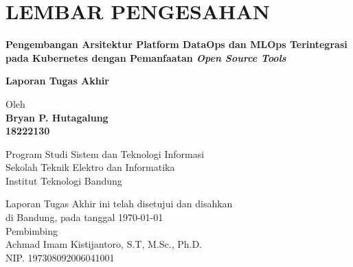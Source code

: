 \chapter*{LEMBAR PENGESAHAN}


\begin{center}
    \vspace{2cm}
  {\large\bfseries Pengembangan Arsitektur Platform DataOps dan MLOps Terintegrasi pada Kubernetes dengan Pemanfaatan \textit{Open Source Tools}}\\
     \vspace{2cm}

  {\Large \textbf{Laporan Tugas Akhir}}\\


  \vspace{1.5cm}


  {\large Oleh}\\[0.3cm]
    \textbf{
    {\large Bryan P. Hutagalung}\\
    {\large 18222130}
  }\\

  \vspace{0.5cm}

  {\large Program Studi Sistem dan Teknologi Informasi}\\
  {\large Sekolah Teknik Elektro dan Informatika}\\
  {\large Institut Teknologi Bandung}\\

  \vspace{1.5cm}

  Laporan Tugas Akhir ini telah disetujui dan disahkan\\
  di Bandung, pada tanggal \today\\[1cm]

	Pembimbing  \\[3cm]
	Achmad Imam Kistijantoro, S.T, M.Sc., Ph.D.   \\[0.2cm]
	NIP. 197308092006041001

\end{center}

\vspace{1cm}
\noindent



